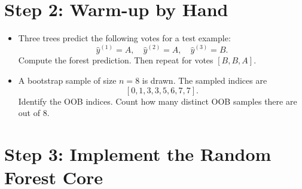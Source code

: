 \section*{Step 2: Warm-up by Hand}
\begin{itemize}
  \item Three trees predict the following votes for a test example:
  \[
    \hat{y}^{(1)} = A,\quad
    \hat{y}^{(2)} = A,\quad
    \hat{y}^{(3)} = B.
  \]
  Compute the forest prediction. Then repeat for votes $[B, B, A]$.
  \item A bootstrap sample of size $n=8$ is drawn. The sampled indices are
  \[
    [0, 1, 3, 3, 5, 6, 7, 7].
  \]
  Identify the OOB indices. Count how many distinct OOB samples there are out of $8$.
\end{itemize}

\section*{Step 3: Implement the Random Forest Core}
